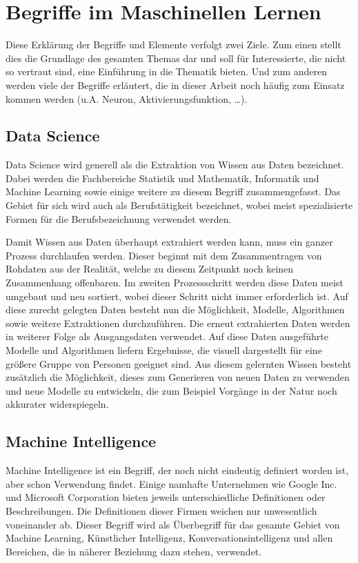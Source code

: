 \chapter{Begriffe im Maschinellen Lernen}
\label{cha:Begriffe}

Diese Erklärung der Begriffe und Elemente verfolgt zwei Ziele.
Zum einen stellt dies die Grundlage des gesamten Themas dar und soll für Interessierte, die nicht so vertraut sind, eine Einführung in die Thematik bieten. 
Und zum anderen werden viele der Begriffe erläutert, die in dieser Arbeit noch häufig zum Einsatz kommen werden (u.A. Neuron, Aktivierungsfunktion, …).

\section{Data Science}

Data Science wird generell als die Extraktion von Wissen aus Daten bezeichnet. 
Dabei werden die Fachbereiche Statistik und Mathematik, Informatik und Machine Learning sowie einige weitere zu diesem Begriff zusammengefasst. 
Das Gebiet für sich wird auch als Berufstätigkeit bezeichnet, wobei meist spezialisierte Formen für die Berufsbezeichnung verwendet werden. \newline

\noindent 
Damit Wissen aus Daten überhaupt extrahiert werden kann, muss ein ganzer Prozess durchlaufen werden. 
Dieser beginnt mit dem Zusammentragen von Rohdaten aus der Realität, welche zu diesem Zeitpunkt noch keinen Zusammenhang offenbaren. 
Im zweiten Prozessschritt werden diese Daten meist umgebaut und neu sortiert, wobei dieser Schritt nicht immer erforderlich ist. 
Auf diese zurecht gelegten Daten besteht nun die Möglichkeit, Modelle, Algorithmen sowie weitere Extraktionen durchzuführen. 
Die erneut extrahierten Daten werden in weiterer Folge als Ausgangsdaten verwendet. 
Auf diese Daten ausgeführte Modelle und Algorithmen liefern Ergebnisse, die visuell dargestellt für eine größere Gruppe von Personen geeignet sind. 
Aus diesem gelernten Wissen besteht zusätzlich die Möglichkeit, dieses zum Generieren von neuen Daten zu verwenden und neue Modelle zu entwickeln, die zum Beispiel Vorgänge in der Natur noch akkurater widerspiegeln.

\section{Machine Intelligence}

Machine Intelligence ist ein Begriff, der noch nicht eindeutig definiert worden ist, aber schon Verwendung findet. 
Einige namhafte Unternehmen wie Google Inc. und Microsoft Corporation bieten jeweils unterschiedliche Definitionen oder Beschreibungen. 
Die Definitionen dieser Firmen weichen nur unwesentlich voneinander ab.
Dieser Begriff wird als Überbegriff für das gesamte Gebiet von Machine Learning, Künstlicher Intelligenz, Konversationsintelligenz und allen Bereichen, die in näherer Beziehung dazu stehen, verwendet. 

